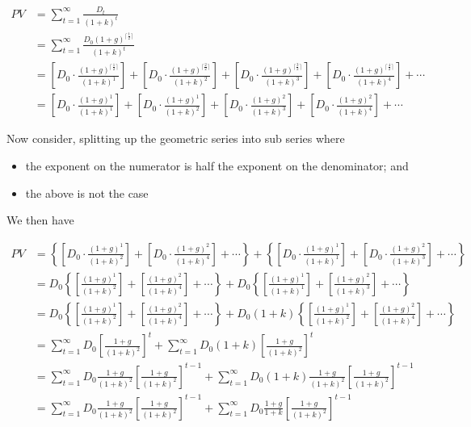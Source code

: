 \documentclass[11pt]{article}
\providecommand{\tightlist}{%
      \setlength{\itemsep}{0pt}\setlength{\parskip}{0pt}}
\begin{document}
\begin{align}
    PV &= \sum_{t=1}^{\infty} \frac{D_t}{(1 + k)^t} \\
    &= \sum_{t=1}^{\infty} \frac{D_0 (1 + g)^{\lceil \frac{t}{2} \rceil}}{(1 + k)^t} \\ 
    &= \left[ D_0 \cdot \frac{(1 + g)^{\lceil \frac{1}{2} \rceil}}{(1 + k)^1} \right] + \left[ D_0 \cdot \frac{(1 + g)^{\lceil \frac{2}{2} \rceil}}{(1 + k)^2} \right] + \left[ D_0 \cdot \frac{(1 + g)^{\lceil \frac{3}{2} \rceil}}{(1 + k)^3} \right] + \left[ D_0 \cdot \frac{(1 + g)^{\lceil \frac{4}{2} \rceil}}{(1 + k)^4} \right] + \cdots \\
    &= \left[ D_0 \cdot \frac{(1 + g)^{1}}{(1 + k)^1} \right] + \left[ D_0 \cdot \frac{(1 + g)^{1}}{(1 + k)^2} \right] + \left[ D_0 \cdot \frac{(1 + g)^{2}}{(1 + k)^3} \right] + \left[ D_0 \cdot \frac{(1 + g)^{2}}{(1 + k)^4} \right] + \cdots
\end{align}

Now consider, splitting up the geometric series into sub series where

\begin{itemize}
\tightlist
\item
  the exponent on the numerator is half the exponent on the denominator;
  and
\item
  the above is not the case
\end{itemize}

We then have

\begin{align}
    PV &= \left\{ \left[ D_0 \cdot \frac{(1 + g)^{1}}{(1 + k)^2} \right] + \left[ D_0 \cdot \frac{(1 + g)^{2}}{(1 + k)^4} \right] + \cdots \right\} + \left\{ \left[ D_0 \cdot \frac{(1 + g)^{1}}{(1 + k)^1} \right] + \left[ D_0 \cdot \frac{(1 + g)^{2}}{(1 + k)^3} \right] + \cdots \right\} \\
    &=  D_0 \left\{ \left[ \frac{(1 + g)^{1}}{(1 + k)^2} \right] + \left[ \frac{(1 + g)^{2}}{(1 + k)^4} \right] + \cdots \right\} + D_0 \left\{ \left[ \frac{(1 + g)^{1}}{(1 + k)^1} \right] + \left[ \frac{(1 + g)^{2}}{(1 + k)^3} \right] + \cdots \right\} \\
    &=  D_0 \left\{ \left[ \frac{(1 + g)^{1}}{(1 + k)^2} \right] + \left[ \frac{(1 + g)^{2}}{(1 + k)^4} \right] + \cdots \right\} + D_0 (1 + k) \left\{ \left[ \frac{(1 + g)^{1}}{(1 + k)^2} \right] + \left[ \frac{(1 + g)^{2}}{(1 + k)^4} \right] + \cdots \right\} \\
    &= \sum_{t=1}^{\infty} D_0 \left[ \frac{1 + g}{(1 + k)^2} \right]^{t} + \sum_{t=1}^{\infty} D_0 (1 + k) \left[ \frac{1 + g}{(1 + k)^2} \right]^{t} \\
    &= \sum_{t=1}^{\infty} D_0 \frac{1 + g}{(1 + k)^2} \left[ \frac{1 + g}{(1 + k)^2} \right]^{t-1} + \sum_{t=1}^{\infty} D_0 (1 + k) \frac{1 + g}{(1 + k)^2} \left[ \frac{1 + g}{(1 + k)^2} \right]^{t-1} \\
    &= \sum_{t=1}^{\infty} D_0 \frac{1 + g}{(1 + k)^2} \left[ \frac{1 + g}{(1 + k)^2} \right]^{t-1} + \sum_{t=1}^{\infty} D_0 \frac{1 + g}{1 + k} \left[ \frac{1 + g}{(1 + k)^2} \right]^{t-1} \\
\end{align}
\end{document}
